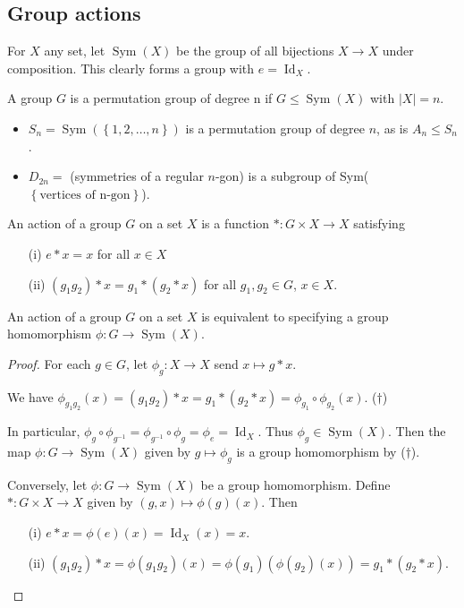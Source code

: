\documentclass[a4paper]{scrartcl}
\begin{document}
\subsection{Group actions}
\begin{definition*}
      For $X$ any set, let $\operatorname{Sym}(X)$ be the group of all bijections $X \rightarrow X$ under composition. This clearly forms a group with $e=\operatorname{Id}_X$.

      A group $G$ is a permutation group of degree n if $G \leq \operatorname{Sym}(X)$ with $|X|=n$. 
\end{definition*}
\begin{example*}\hfill
      \begin{itemize}
           \item $S_{n}=\operatorname{Sym}(\left\{1,2,\ldots ,n\right\})$ is a permutation group of degree $n$, as is $A_{n}\leq S_{n}$.
           \item $D_{2n}=$ (symmetries of a regular $n$-gon) is a subgroup of Sym($\left\{\text{vertices of n-gon}\right\}$).
      \end{itemize}
\end{example*}
\begin{definition*}
      An action of a group $G$ on a set $X$ is a function $\ast: G \times X \rightarrow X$ satisfying 
      \begin{itemize}
           \item[(i)] $e \ast x =x $ for all $x \in X$ 
           \item[(ii)] $(g_1 g_2 )\ast x= g_1 \ast (g_2 \ast x)$ for all $g_1 ,g_2 \in G$, $x \in X$.
      \end{itemize}
\end{definition*}
\begin{proposition}
     An action of a group $G$ on a set $X$ is equivalent to specifying a group homomorphism $\phi: G \rightarrow \operatorname{Sym}(X)$.
\end{proposition}
\begin{proof}
      For each $g \in G$, let $\phi_{g}: X \rightarrow X$ send $x \mapsto g \ast x$. 

      We have $\phi_{g_1 g_2 }(x)=(g_1 g_2 )\ast x=g_1 \ast (g_2 \ast x)=\phi_{g_1 }\circ \phi_{g_2 }(x)$. ($\dagger$)

      In particular, $\phi_{g}\circ \phi_{{g}^{-1}}=\phi_{{g}^{-1}}\circ \phi_{g}=\phi_{e}=\operatorname{Id}_X$. Thus $\phi_{g} \in \operatorname{Sym}(X)$. Then the map $\phi: G \rightarrow \operatorname{Sym}(X)$ given by $g \mapsto \phi_{g}$ is a group homomorphism by ($\dagger$).

      Conversely, let $\phi: G \rightarrow \operatorname{Sym}(X)$ be a group homomorphism. Define $\ast: G \times X \rightarrow X$ given by $(g,x) \mapsto \phi (g)(x)$. Then
      \begin{itemize}
           \item[(i)] $e \ast x=\phi (e)(x)=\operatorname{Id}_X (x)=x$.
           \item[(ii)] $(g_1 g_2 )\ast x= \phi (g_1 g_2 )(x)=\phi (g_1 )(\phi (g_2)(x))=g_1 \ast (g_2 \ast x)$. 
      \end{itemize}
\end{proof}
\end{document}
